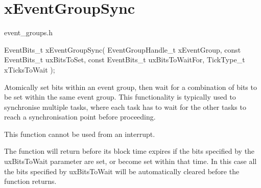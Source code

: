 \hypertarget{group__xEventGroupSync}{}\section{x\+Event\+Group\+Sync}
\label{group__xEventGroupSync}
event\+\_\+groups.\+h 
\begin{DoxyPre}
   EventBits\_t xEventGroupSync( EventGroupHandle\_t xEventGroup,
                                const EventBits\_t uxBitsToSet,
                                const EventBits\_t uxBitsToWaitFor,
                                TickType\_t xTicksToWait );
\end{DoxyPre}


Atomically set bits within an event group, then wait for a combination of bits to be set within the same event group. This functionality is typically used to synchronise multiple tasks, where each task has to wait for the other tasks to reach a synchronisation point before proceeding.

This function cannot be used from an interrupt.

The function will return before its block time expires if the bits specified by the ux\+Bits\+To\+Wait parameter are set, or become set within that time. In this case all the bits specified by ux\+Bits\+To\+Wait will be automatically cleared before the function returns.


